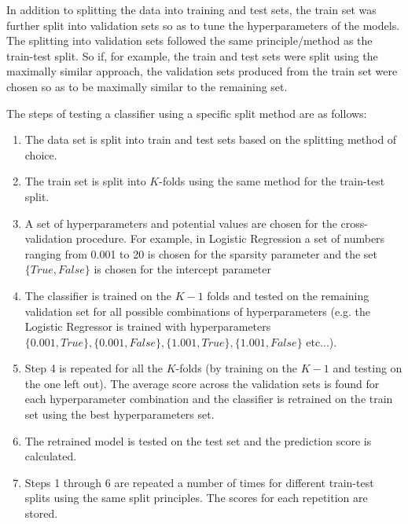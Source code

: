 In addition to splitting the data into training and test sets, the train set was further split into validation sets so as to tune the hyperparameters of the models. The splitting into validation sets followed the same principle/method as the train-test split. So if, for example, the train and test sets were split using the maximally similar approach, the validation sets produced from the train set were chosen so as to be maximally similar to the remaining set.


The steps of testing a classifier using a specific split method are as follows:
\begin{enumerate}
\item The data set is split into train and test sets based on the splitting method of choice. 
\item The train set is split into $K$-folds using the same method for the train-test split.
\item A set of hyperparameters and potential values are chosen for the cross-validation procedure. For example, in Logistic Regression a set of numbers ranging from 0.001 to 20 is chosen for the sparsity parameter and the set $\{True,False\}$ is chosen for the intercept parameter    
\item The classifier is trained on the $K-1$ folds and tested on the remaining validation set for all possible combinations of hyperparameters (e.g. the Logistic Regressor is trained with hyperparameters $\{0.001,True\},\{0.001,False\},\{1.001,True\},\{1.001,False\}$ etc...).
\item Step 4 is repeated for all the $K$-folds (by training on the $K-1$ and testing on the one left out). The average score across the validation sets is found for each hyperparameter combination and the classifier is retrained on the train set using the best hyperparameters set.
\item The retrained model is tested on the test set and the prediction score is calculated.
\item Steps  1 through 6 are repeated a number of times for different train-test splits using the same split principles. The scores for each repetition are stored.  
\end{enumerate}


